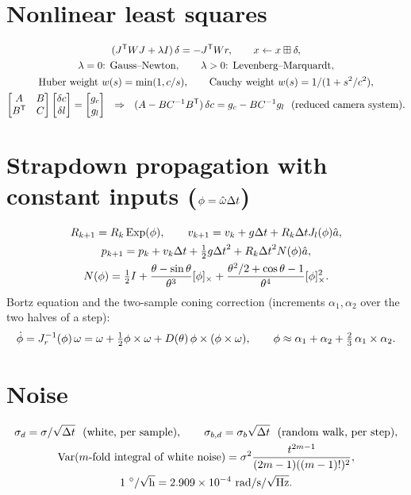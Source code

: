 \section*{Nonlinear least squares}
\begin{gather*}
  (J\T WJ + \lambda I)\,\delta = -J\T Wr, \qquad x \gets x\bplus\delta, \\
  \lambda = 0\text{: Gauss--Newton}, \qquad \lambda > 0\text{: Levenberg--Marquardt}, \\
  \text{Huber weight } w(s) = \min(1, c/s), \qquad \text{Cauchy weight } w(s) = 1/(1 + s^2/c^2), \\
  \begin{bmatrix} A & B \\ B\T & C\end{bmatrix}\begin{bmatrix}\delta c \\ \delta l\end{bmatrix} = \begin{bmatrix} g_c \\ g_l\end{bmatrix}
  \ \ \Rightarrow\ \ (A - BC\inv B\T)\,\delta c = g_c - BC\inv g_l \ \ \text{(reduced camera system)} .
\end{gather*}

\section*{Strapdown propagation with constant inputs (\texorpdfstring{$\phi = \hat\omega{\Delta t}$}{phi = omega dt})}
\begin{gather*}
  R_{k+1} = R_k\operatorname{Exp}(\phi), \qquad v_{k+1} = v_k + g{\Delta t} + R_k{\Delta t}J_l(\phi)\hat a, \\
  p_{k+1} = p_k + v_k{\Delta t} + \tfrac12g{\Delta t}^2 + R_k{\Delta t}^2N(\phi)\hat a, \\
  N(\phi) = \tfrac12I + \frac{\theta - \sin\theta}{\theta^3}[\phi]_{\times} + \frac{\theta^2/2 + \cos\theta - 1}{\theta^4}[\phi]_{\times}^2 .
\end{gather*}
Bortz equation and the two-sample coning correction (increments $\alpha_1, \alpha_2$ over the two halves of a step):
\begin{gather*}
  \dot\phi = J_r^{-1}(\phi)\,\omega = \omega + \tfrac12\phi\times\omega + D(\theta)\,\phi\times(\phi\times\omega), \qquad
  \phi \approx \alpha_1 + \alpha_2 + \tfrac23\,\alpha_1\times\alpha_2 .
\end{gather*}

\section*{Noise}
\begin{gather*}
  \sigma_d = \sigma/\sqrt{{\Delta t}}\ \ \text{(white, per sample)}, \qquad \sigma_{b,d} = \sigma_b\sqrt{{\Delta t}}\ \ \text{(random walk, per step)}, \\
  \operatorname{Var}(m\text{-fold integral of white noise}) = \sigma^2\frac{t^{2m-1}}{(2m-1)((m-1)!)^2}, \\
  1\ ^\circ/\sqrt{\mathrm h} = 2.909\times10^{-4}~\mathrm{rad/s/\sqrt{Hz}} .
\end{gather*}

